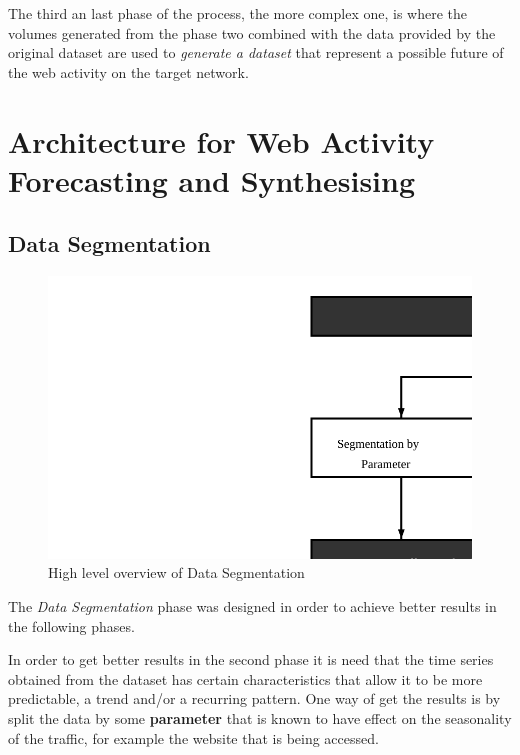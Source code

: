 The third an last phase of the process, the more complex one, is where the volumes
generated from the phase two combined with the data provided by the original
dataset are used to \emph{generate a dataset} that represent a possible future of the
web activity on the target network.

\section{Architecture for Web Activity Forecasting and Synthesising}

\subsection{Data Segmentation}\label{subsec:seg}

\begin{figure}[h] \begin{center} \leavevmode
\includegraphics[]{segmentation} \caption{ High level overview
of Data Segmentation} \label{fig:segmentation_arch} \end{center} \end{figure}

The \emph{Data Segmentation} phase was designed in order to achieve better
results in the following phases. 

In order to get better results in the second phase it is need that the time
series obtained from the dataset has certain characteristics that allow it to be
more predictable, a trend and/or a recurring pattern. One way of get the results
is by split the data by some \textbf{parameter} that is known to have effect on the
seasonality of the traffic, for example the website that is being accessed.

